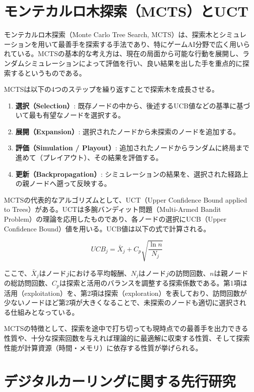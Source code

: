 \documentclass[11pt,a4j]{jreport}
\begin{document}
\section[MCTSとUCT]{モンテカルロ木探索（MCTS）とUCT}
モンテカルロ木探索（Monte Carlo Tree Search, MCTS）は、探索木とシミュレーションを用いて最善手を探索する手法であり、特にゲームAI分野で広く用いられている\cite{imagawa2018mcts}。MCTSの基本的な考え方は、現在の局面から可能な行動を展開し、ランダムシミュレーションによって評価を行い、良い結果を出した手を重点的に探索するというものである。

MCTSは以下の4つのステップを繰り返すことで探索木を成長させる。
\begin{enumerate}
    \item \textbf{選択（Selection）}: 既存ノードの中から、後述するUCB値などの基準に基づいて最も有望なノードを選択する。
    \item \textbf{展開（Expansion）}: 選択されたノードから未探索のノードを追加する。
    \item \textbf{評価（Simulation / Playout）}: 追加されたノードからランダムに終局まで進めて（プレイアウト）、その結果を評価する。
    \item \textbf{更新（Backpropagation）}: シミュレーションの結果を、選択された経路上の親ノードへ遡って反映する。
\end{enumerate}

MCTSの代表的なアルゴリズムとして、UCT（Upper Confidence Bound applied to Trees）がある。UCTは多腕バンディット問題（Multi-Armed Bandit Problem）の理論を応用したものであり、各ノードの選択にUCB（Upper Confidence Bound）値を用いる。UCB値は以下の式で計算される。

\begin{equation}
    UCB_j = \bar{X}_j + C_p \sqrt{\frac{\ln n}{N_j}}
\end{equation}

ここで、$\bar{X}_j$はノード$j$における平均報酬、$N_j$はノード$j$の訪問回数、$n$は親ノードの総訪問回数、$C_p$は探索と活用のバランスを調整する探索係数である。第1項は活用（exploitation）を、第2項は探索（exploration）を表しており、訪問回数が少ないノードほど第2項が大きくなることで、未探索のノードも適切に選択される仕組みとなっている。

MCTSの特徴として、探索を途中で打ち切っても現時点での最善手を出力できる性質や、十分な探索回数を与えれば理論的に最適解に収束する性質、そして探索性能が計算資源（時間・メモリ）に依存する性質が挙げられる。


\section[先行研究]{デジタルカーリングに関する先行研究}
\end{document}
